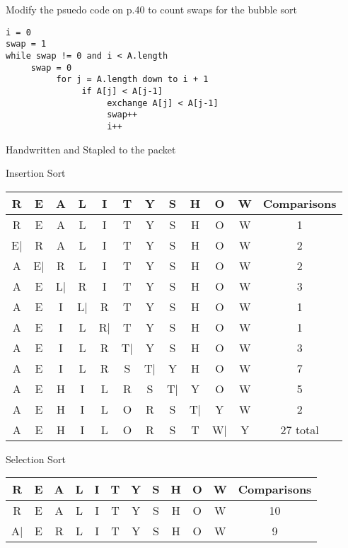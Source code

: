 \documentclass[12pt,largemargins]{homework}
\begin{document}
\newpage
\question
Modify the psuedo code on p.40 to count swaps for the bubble sort
\begin{verbatim}
i = 0
swap = 1
while swap != 0 and i < A.length
     swap = 0
          for j = A.length down to i + 1
               if A[j] < A[j-1]
                    exchange A[j] < A[j-1]
                    swap++
                    i++ 
\end{verbatim}

\question
	Handwritten and Stapled to the packet
	\begin{alphaparts}
	\item
	Insertion Sort
	\begin{center}
		\begin{tabular}{c c c c c c c c c c c c}
		\hline
		R & E & A & L & I & T & Y & S & H & O & W & Comparisons\\
		\hline
		R & E & A & L & I & T & Y & S & H & O & W & 1\\
		\hline
		E| & R & A & L & I & T & Y & S & H & O & W & 2 \\
		\hline
		A & E| & R & L & I & T & Y & S & H & O & W & 2 \\
		\hline
		A & E & L| & R & I & T & Y& S & H & O & W & 3 \\
		\hline
		A & E & I & L| & R & T & Y & S & H & O & W & 1 \\
		\hline
		A & E & I & L & R| & T & Y & S & H & O & W & 1 \\
		\hline
		A & E & I & L & R & T| & Y & S & H & O & W & 3 \\
		\hline
		A & E & I & L & R & S & T| & Y & H & O & W & 7 \\
		\hline
		A & E & H & I & L & R & S & T| &  Y  & O & W & 5 \\
		\hline
		A & E & H & I & L & O & R & S & T| &  Y  & W & 2 \\
		\hline
		A & E & H & I & L & O & R & S & T &  W|  & Y & 27 total \\
		\end{tabular}
	\end{center}
	\newpage
	\item
	Selection Sort
	\begin{center}
		\begin{tabular}{c c c c c c c c c c c c}
		\hline
		R & E & A & L & I & T & Y & S & H & O & W & Comparisons\\
		\hline
		R & E & A & L & I & T & Y & S & H & O & W & 10\\
		\hline
		A| & E & R & L & I & T & Y & S & H & O & W & 9\\

\end{tabular}
\end{center}
\end{alphaparts}
\end{document}
